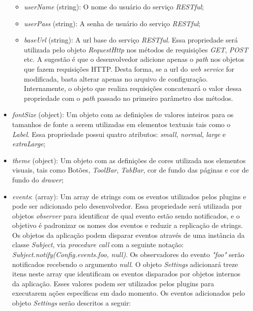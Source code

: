 \begin{itemize}
	\begin{itemize}
		\item \textit{userName} (string): O nome do usuário do serviço \textit{RESTful};

		\item \textit{userPass} (string): A senha de usuário do serviço \textit{RESTful};

		\item \textit{baseUrl} (string): A url base do serviço \textit{RESTful}. Essa propriedade será utilizada pelo objeto \textit{RequestHttp} nos métodos de requisições \textit{GET}, \textit{POST} etc. A sugestão é que o desenvolvedor adicione apenas o \textit{path} nos objetos que fazem requisições HTTP. Desta forma, se a url do \textit{web service} for modificada, basta alterar apenas no arquivo de configuração. Internamente, o objeto que realiza requisições concatenará o valor dessa propriedade com o \textit{path} passado no primeiro parâmetro dos métodos.
	\end{itemize}

	\item \textit{fontSize} (object): Um objeto com as definições de valores inteiros para os tamanhos de fonte a serem utilizadas em elementos textuais tais como o \textit{Label}. Essa propriedade possui quatro atributos: \textit{small}, \textit{normal}, \textit{large} e \textit{extraLarge};

	\item \textit{theme} (object): Um objeto com as definições de cores utilizada nos elementos visuais, tais como Botões, \textit{ToolBar}, \textit{TabBar}, cor de fundo das páginas e cor de fundo do \textit{drawer};

	\item \textit{events}: (array): Um array de strings com os eventos utilizados pelos plugins e pode ser adicionado pelo desenvolvedor. Essa propriedade será utilizada por objetos \textit{observer} para identificar de qual evento estão sendo notificados, e o objetivo é padronizar os nomes dos eventos e reduzir a replicação de strings. Os objetos da aplicação podem disparar eventos através de uma instância da classe \textit{Subject}, via \textit{procedure call} com a seguinte notação: \textit{Subject.notify(Config.events.foo, null)}. Os observadores do evento \textit{"foo"} serão notificados recebendo o argumento \textit{null}. O objeto \textit{Settings} adicionará treze itens neste array que identificam os eventos disparados por objetos internos da aplicação. Esses valores podem ser utilizados pelos plugins para executarem ações específicas em dado momento. Os eventos adicionados pelo objeto \textit{Settings} serão descritos a seguir:


\end{itemize}

